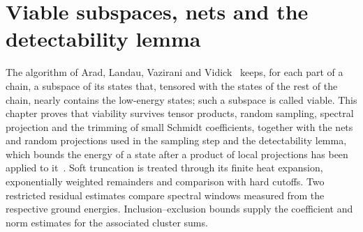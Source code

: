 \chapter{Viable subspaces, nets and the detectability lemma}
\label{ch:viable_subspaces}

The algorithm of Arad, Landau, Vazirani and Vidick~\cite{Arad2016RigorousRG}
keeps, for each part of a chain, a subspace of its states that, tensored with
the states of the rest of the chain, nearly contains the low-energy states;
such a subspace is called viable. This chapter proves that viability survives
tensor products, random sampling, spectral projection and the trimming of small
Schmidt coefficients, together with the nets and random projections used in the
sampling step and the detectability lemma, which bounds the energy of a state
after a product of local projections has been applied to
it~\cite{Anshu2016Simple}. Soft truncation is treated through its finite
heat expansion, exponentially weighted remainders and comparison with hard
cutoffs. Two restricted residual estimates compare spectral windows measured
from the respective ground energies. Inclusion--exclusion bounds supply
the coefficient and norm estimates for the associated cluster sums.



























